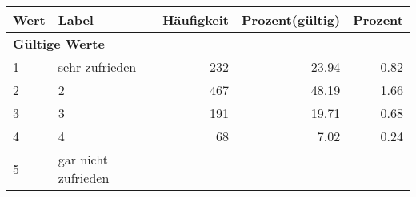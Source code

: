      \begin{longtable}{lXrrr}
     \toprule
     \textbf{Wert} & \textbf{Label} & \textbf{Häufigkeit} & \textbf{Prozent(gültig)} & \textbf{Prozent} \\
     \endhead
     \midrule
     \multicolumn{5}{l}{\textbf{Gültige Werte}}\\

     1 &
     \multicolumn{1}{X}{ sehr zufrieden   } &


       \num{232} &
       \num[round-mode=places,round-precision=2]{23.94} &
         \num[round-mode=places,round-precision=2]{0.82} \\

     2 &
     \multicolumn{1}{X}{ 2   } &


       \num{467} &
       \num[round-mode=places,round-precision=2]{48.19} &
         \num[round-mode=places,round-precision=2]{1.66} \\

     3 &
     \multicolumn{1}{X}{ 3   } &


       \num{191} &
       \num[round-mode=places,round-precision=2]{19.71} &
         \num[round-mode=places,round-precision=2]{0.68} \\

     4 &
     \multicolumn{1}{X}{ 4   } &


       \num{68} &
       \num[round-mode=places,round-precision=2]{7.02} &
         \num[round-mode=places,round-precision=2]{0.24} \\

     5 &
     \multicolumn{1}{X}{ gar nicht zufrieden   } &



\end{longtable}

